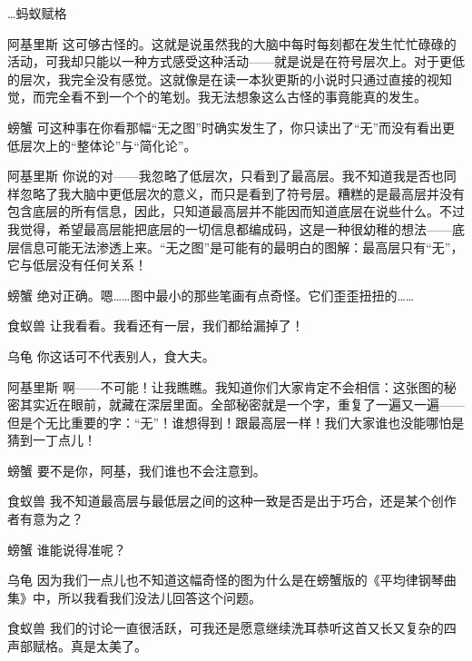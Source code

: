 \begin{dialog}{…蚂蚁赋格}
\begin{dialogue}
\item[阿基里斯]这可够古怪的。这就是说虽然我的大脑中每时每刻都在发生忙忙碌碌的活动，可我却只能以一种方式感受这种活动——就是说是在符号层次上。对于更低的层次，我完全没有感觉。这就像是在读一本狄更斯的小说时只通过直接的视知觉，而完全看不到一个个的笔划。我无法想象这么古怪的事竟能真的发生。

\item[螃蟹]可这种事在你看那幅“无之图”时确实发生了，你只读出了“无”而没有看出更低层次上的“整体论”与“简化论”。

\item[阿基里斯]你说的对——我忽略了低层次，只看到了最高层。我不知道我是否也同样忽略了我大脑中更低层次的意义，而只是看到了符号层。糟糕的是最高层并没有包含底层的所有信息，因此，只知道最高层并不能因而知道底层在说些什么。不过我觉得，希望最高层能把底层的一切信息都编成码，这是一种很幼稚的想法——底层信息可能无法渗透上来。“无之图”是可能有的最明白的图解：最高层只有“无”，它与低层没有任何关系！

\item[螃蟹]绝对正确。嗯……图中最小的那些笔画有点奇怪。它们歪歪扭扭的……

\item[食蚁兽]让我看看。我看还有一层，我们都给漏掉了！

\item[乌龟]你这话可不代表别人，食大夫。

\item[阿基里斯]啊——不可能！让我瞧瞧。我知道你们大家肯定不会相信：这张图的秘密其实近在眼前，就藏在深层里面。全部秘密就是一个字，重复了一遍又一遍——但是个无比重要的字：“无”！谁想得到！跟最高层一样！我们大家谁也没能哪怕是猜到一丁点儿！

\item[螃蟹]要不是你，阿基，我们谁也不会注意到。

\item[食蚁兽]我不知道最高层与最低层之间的这种一致是否是出于巧合，还是某个创作者有意为之？

\item[螃蟹]谁能说得准呢？

\item[乌龟]因为我们一点儿也不知道这幅奇怪的图为什么是在螃蟹版的《平均律钢琴曲集》中，所以我看我们没法儿回答这个问题。

\item[食蚁兽]我们的讨论一直很活跃，可我还是愿意继续洗耳恭听这首又长又复杂的四声部赋格。真是太美了。


\end{dialogue}
\end{dialog}
